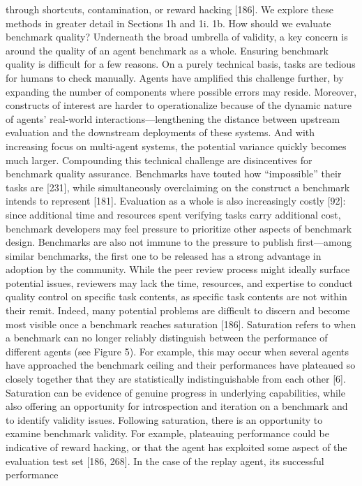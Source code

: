 through shortcuts, contamination, or reward hacking [186]. We explore these methods in greater detail in
Sections 1h and 1i.
1b. How should we evaluate benchmark quality?
Underneath the broad umbrella of validity, a key concern is around the quality of an agent benchmark
as a whole. Ensuring benchmark quality is difficult for a few reasons. On a purely technical basis, tasks
are tedious for humans to check manually. Agents have amplified this challenge further, by expanding the
number of components where possible errors may reside. Moreover, constructs of interest are harder to
operationalize because of the dynamic nature of agents’ real-world interactions—lengthening the distance
between upstream evaluation and the downstream deployments of these systems. And with increasing
focus on multi-agent systems, the potential variance quickly becomes much larger.
Compounding this technical challenge are disincentives for benchmark quality assurance. Benchmarks
have touted how “impossible” their tasks are [231], while simultaneously overclaiming on the construct
a benchmark intends to represent [181]. Evaluation as a whole is also increasingly costly [92]: since
additional time and resources spent verifying tasks carry additional cost, benchmark developers may feel
pressure to prioritize other aspects of benchmark design. Benchmarks are also not immune to the pressure
to publish first—among similar benchmarks, the first one to be released has a strong advantage in adoption
by the community. While the peer review process might ideally surface potential issues, reviewers may
lack the time, resources, and expertise to conduct quality control on specific task contents, as specific task
contents are not within their remit.
Indeed, many potential problems are difficult to discern and become most visible once a benchmark reaches
saturation [186]. Saturation refers to when a benchmark can no longer reliably distinguish between the
performance of different agents (see Figure 5). For example, this may occur when several agents have
approached the benchmark ceiling and their performances have plateaued so closely together that they
are statistically indistinguishable from each other [6]. Saturation can be evidence of genuine progress in
underlying capabilities, while also offering an opportunity for introspection and iteration on a benchmark
and to identify validity issues. Following saturation, there is an opportunity to examine benchmark validity.
For example, plateauing performance could be indicative of reward hacking, or that the agent has exploited
some aspect of the evaluation test set [186, 268]. In the case of the replay agent, its successful performance
